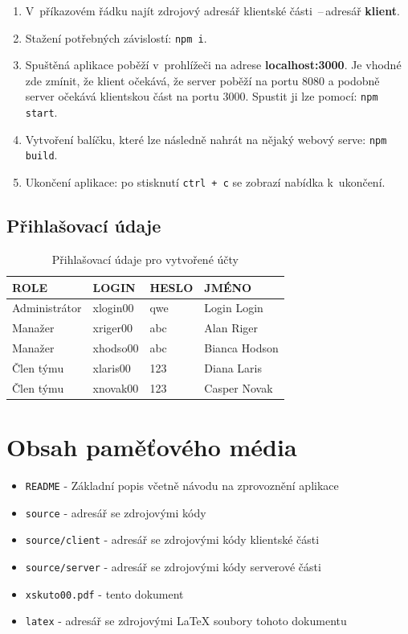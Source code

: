 \begin{enumerate}
    \item V~příkazovém řádku najít zdrojový adresář klientské části \,--\,adresář \textbf{klient}.
    \item Stažení potřebných závislostí: \texttt{npm i}.
    \item Spuštěná aplikace poběží v~prohlížeči na adrese \textbf{localhost:3000}. Je vhodné zde zmínit, že klient očekává, že server poběží na portu 8080 a podobně server očekává klientskou část na portu 3000. Spustit ji lze pomocí: \texttt{npm start}.
    \item Vytvoření balíčku, které lze následně nahrát na nějaký webový serve: \texttt{npm build}.
    \item Ukončení aplikace: po stisknutí \texttt{ctrl + c} se zobrazí nabídka k~ukončení.
\end{enumerate}

\section{Přihlašovací údaje}

\begin{table}[h]
\centering
\begin{tabular}{|l|l|l|l|}
\hline
ROLE          & LOGIN    & HESLO & JMÉNO         \\ \hline
Administrátor & xlogin00 & qwe   & Login Login   \\ \hline
Manažer       & xriger00 & abc   & Alan Riger    \\ \hline
Manažer       & xhodso00 & abc   & Bianca Hodson \\ \hline
Člen týmu     & xlaris00 & 123   & Diana Laris   \\ \hline
Člen týmu     & xnovak00 & 123   & Casper Novak  \\ \hline
\end{tabular}
\caption{Přihlašovací údaje pro vytvořené účty}
\end{table}

\chapter{Obsah paměťového média}
\label{prilohaCD}

\begin{itemize}
    \item \texttt{README} - Základní popis včetně návodu na zprovoznění aplikace
    \item \texttt{source} - adresář se zdrojovými kódy
    \item \texttt{source/client} - adresář se zdrojovými kódy klientské části
    \item \texttt{source/server} - adresář se zdrojovými kódy serverové části
    \item \texttt{xskuto00.pdf} - tento dokument
    \item \texttt{latex} - adresář se zdrojovými \LaTeX{} soubory tohoto dokumentu
\end{itemize}
